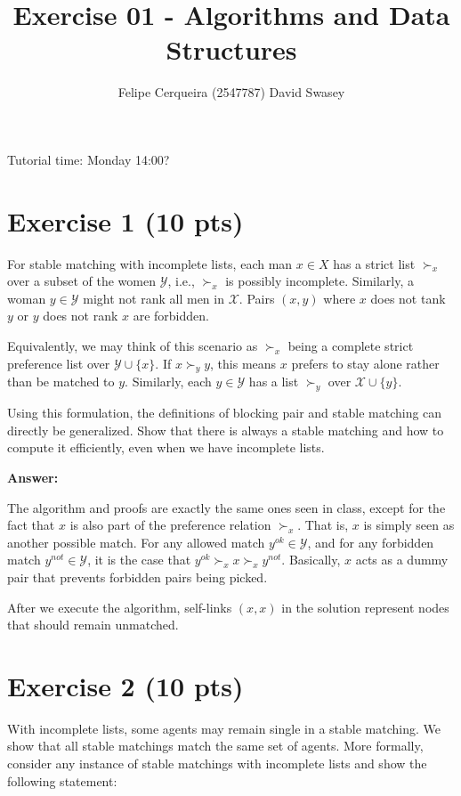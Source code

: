 \documentclass{article}
\title{Exercise 01 - Algorithms and Data Structures}
\author{Felipe Cerqueira (2547787) \quad David Swasey}
\begin{document}
\maketitle

Tutorial time: Monday 14:00?

\section{Exercise 1 (10 pts)}

For stable matching with incomplete lists, each man $x \in X$ has a strict list $\succ_x$ over a subset of the women $\mathcal{Y}$, i.e., $\succ_x$ is possibly incomplete. Similarly, a woman $y \in \mathcal{Y}$ might not rank all men in $\mathcal{X}$. Pairs $(x,y)$ where $x$ does not tank $y$ or $y$ does not rank $x$ are forbidden.

Equivalently, we may think of this scenario as $\succ_x$ being a complete strict preference list over $\mathcal{Y} \cup \{x\}$. If $x \succ_y y$, this means $x$ prefers to stay alone rather than be matched to $y$. Similarly, each $y \in \mathcal{Y}$ has a list $\succ_y$ over $\mathcal{X} \cup \{y\}$.

Using this formulation, the definitions of blocking pair and stable matching can directly be generalized. Show that there is always a stable matching and how to compute it efficiently, even when we have incomplete lists.

\bigskip \noindent \textbf{Answer:}

The algorithm and proofs are exactly the same ones seen in class, except for the fact that $x$ is also part of the preference relation $\succ_x$. That is, $x$ is simply seen as another possible match. For any allowed match $y^{ok} \in \mathcal{Y}$, and for any forbidden match $y^{not} \in \mathcal{Y}$, it is the case that $y^{ok} \succ_x x \succ_x y^{not}$. Basically, $x$ acts as a dummy pair that prevents forbidden pairs being picked.

After we execute the algorithm, self-links $(x,x)$ in the solution represent nodes that should remain unmatched.

\section{Exercise 2 (10 pts)}

With incomplete lists, some agents may remain single in a stable matching. We show that all stable matchings match the same set of agents. More formally, consider any instance of stable matchings with incomplete lists and show the following statement:
\end{document}

